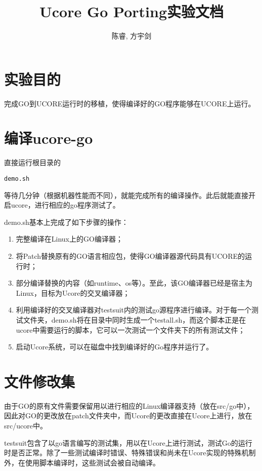 \documentclass{article}
\begin{document}

\author{陈睿, 方宇剑}
\title{Ucore Go Porting实验文档}
\maketitle

\section{实验目的}
完成GO到UCORE运行时的移植，使得编译好的GO程序能够在UCORE上运行。

\section{编译ucore-go}
直接运行根目录的
\begin{lstlisting}
demo.sh
\end{lstlisting}
等待几分钟（根据机器性能而不同），就能完成所有的编译操作。此后就能直接开启ucore，进行相应的go程序测试了。

demo.sh基本上完成了如下步骤的操作：
\begin{enumerate}
  \item 完整编译在Linux上的GO编译器；
  \item 将Patch替换原有的GO语言相应包，使得GO编译器源代码具有UCORE的运行时；
  \item 部分编译替换的内容（如runtime、os等）。至此，该GO编译器已经是宿主为Linux，目标为Ucore的交叉编译器；
  \item 利用编译好的交叉编译器对testsuit内的测试go源程序进行编译。对于每一个测试文件夹，demo.sh将在目录中同时生成一个testall.sh，而这个脚本正是在ucore中需要运行的脚本，它可以一次测试一个文件夹下的所有测试文件；
  \item 启动Ucore系统，可以在磁盘中找到编译好的Go程序并运行了。
\end{enumerate}

\section{文件修改集}
由于GO的原有文件需要保留用以进行相应的Linux编译器支持（放在src/go中），因此对GO的更改放在patch文件夹中，而Ucore的更改直接在Ucore上进行，放在src/ucore中。

testsuit包含了以go语言编写的测试集，用以在Ucore上进行测试，测试Go的运行时是否正常。除了一些测试编译时错误、特殊错误和尚未在Ucore实现的特殊机制外，在使用脚本编译时，这些测试会被自动编译。
\end{document}
